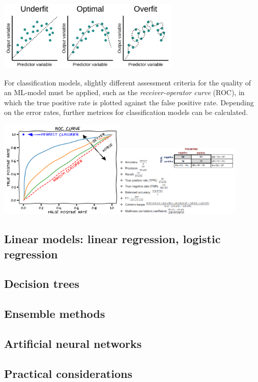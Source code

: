 \begin{center}\includegraphics[width=0.65\textwidth]{img/machine/MachineOverUnderFiting.png}\end{center}

For classification models, slightly different assessment criteria for the quality of an ML-model must be applied, such as the \emph{receiver-operator curve} (ROC), in which the true positive rate is plotted against the false positive rate. Depending on the error rates, further metrices for classification models can be calculated.

\begin{center}\includegraphics[width=0.45\textwidth]{img/machine/MachineRocCurve.png}\includegraphics[width=0.45\textwidth]{img/machine/MachineClassificationMetrices.png}\end{center}

\subsection{Linear models: linear regression, logistic regression}



\subsection{Decision trees}

\subsection{Ensemble methods}

\subsection{Artificial neural networks}

\subsection{Practical considerations}